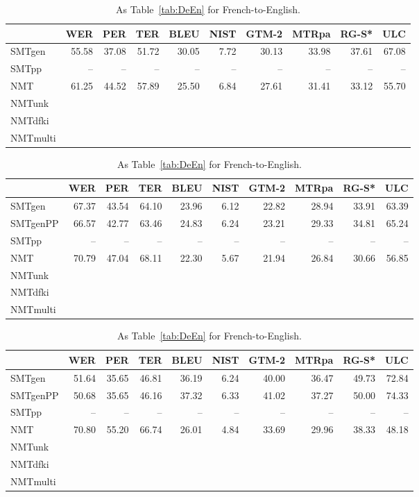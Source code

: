 \documentclass[a4paper,11pt]{article}
\begin{document}
\begin{table}[t]
\small
{}
\begin{tabular}{lrrrrrrrrr}
\toprule
         & WER   &  PER  & TER   &  BLEU & NIST & GTM-2 & MTRpa & RG-S* & ULC \\
\midrule
SMTgen	 & 55.58 & 37.08 & 51.72 & 30.05 & 7.72 & 30.13 & 33.98 & 37.61 & 67.08 \\  
SMTpp    &   --  &   --  &   --  &   --  &  --  &   --  &   --  &   --  &   --  \\
NMT	 & 61.25 & 44.52 & 57.89 & 25.50 & 6.84 & 27.61 & 31.41 & 33.12 & 55.70 \\  
NMTunk  \\
NMTdfki \\
NMTmulti \\
\bottomrule
\end{tabular}

\begin{tabular}{lrrrrrrrrr}
\toprule
         & WER   &  PER  & TER   &  BLEU & NIST & GTM-2 & MTRpa & RG-S* & ULC \\
\midrule
SMTgen	 & 67.37 & 43.54 & 64.10 & 23.96 & 6.12 & 22.82 & 28.94 & 33.91 & 63.39 \\  
SMTgenPP & 66.57 & 42.77 & 63.46 & 24.83 & 6.24 & 23.21 & 29.33 & 34.81 & 65.24 \\  
SMTpp    &   --  &   --  &   --  &   --  &  --  &   --  &   --  &   --  &   --  \\
NMT	 & 70.79 & 47.04 & 68.11 & 22.30 & 5.67 & 21.94 & 26.84 & 30.66 & 56.85 \\  
NMTunk  \\
NMTdfki \\
NMTmulti \\
\bottomrule
\end{tabular}

\begin{tabular}{lrrrrrrrrr}
\toprule
         & WER   &  PER  & TER   &  BLEU & NIST & GTM-2 & MTRpa & RG-S* & ULC \\
\midrule
SMTgen	 & 51.64 & 35.65 & 46.81 & 36.19 & 6.24 & 40.00 & 36.47 & 49.73 & 72.84 \\  
SMTgenPP & 50.68 & 35.65 & 46.16 & 37.32 & 6.33 & 41.02 & 37.27 & 50.00 & 74.33 \\  
SMTpp    &   --  &   --  &   --  &   --  &  --  &   --  &   --  &   --  &   --  \\
NMT	 & 70.80 & 55.20 & 66.74 & 26.01 & 4.84 & 33.69 & 29.96 & 38.33 & 48.18 \\  
NMTunk  \\
NMTdfki \\
NMTmulti \\
\bottomrule
\end{tabular}
 \caption{As Table~\ref{tab:DeEn} for French-to-English.}
 \label{tab:FrEn}
\end{table}
\end{document}
